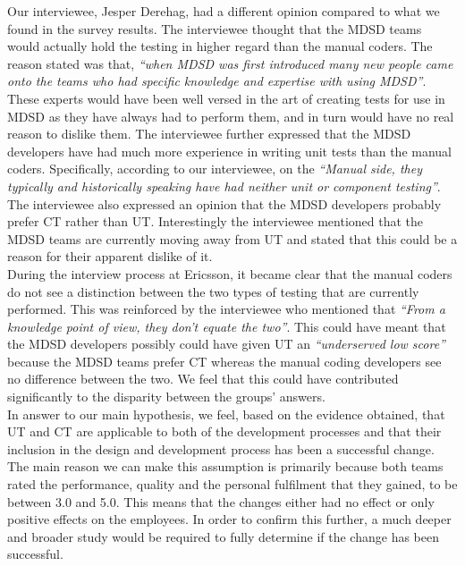 \documentclass[final_report_innit.tex]{subfiles}
\begin{document}
Our interviewee, Jesper Derehag, had a different opinion compared to what we found in the survey results. The interviewee thought that the MDSD teams would actually hold the testing in higher regard than the manual coders. The reason stated was that, \textit{``when MDSD was first introduced many new people came onto the teams who had specific knowledge and expertise with using MDSD''}. These experts would have been well versed in the art of creating tests for use in MDSD as they have always had to perform them, and in turn would have no real reason to dislike them. The interviewee further expressed that the MDSD developers have had much more experience in writing unit tests than the manual coders. Specifically, according to our interviewee, on the \textit{``Manual side, they typically and historically speaking have had neither unit or component testing''}. The interviewee also expressed an opinion that the MDSD developers probably prefer CT rather than UT. Interestingly the interviewee mentioned that the MDSD teams are currently moving away from UT and stated that this could be a reason for their apparent dislike of it.
\\

During the interview process at Ericsson, it became clear that the manual coders do not see a distinction between the two types of
testing that are currently performed. This was reinforced by the interviewee who mentioned that \textit{``From a knowledge point of view, they don't equate the two''}. This could have meant that the MDSD developers possibly could have given UT an \textit{``underserved low score''} because the MDSD teams prefer CT whereas the manual coding developers see no difference between the two. We feel that this could have contributed significantly to the disparity between the groups' answers.
\\

In answer to our main hypothesis, we feel, based on the evidence obtained, that UT and CT are applicable to both of the development processes and that their inclusion in the design and development process has been a successful change. The main reason we can make this assumption is primarily because both teams rated the performance, quality and the personal fulfilment that they gained, to be between 3.0 and 5.0. This means that the changes either had no effect or only positive effects on the employees. In order to confirm this further, a much deeper and broader study would be required to fully determine if the change has been successful.
\end{document}
